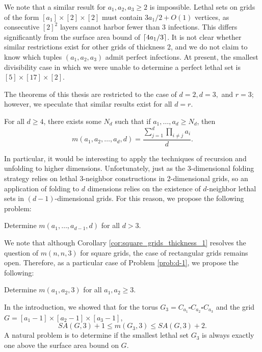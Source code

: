 We note that a similar result for $a_1, a_2,a_3 \geq 2$ is impossible. Lethal sets on grids of the form $[a_1] \times [2] \times [2]$ must contain $3a_1/2+O(1)$ vertices, as consecutive $[2]^2$ layers cannot harbor fewer than 3 infections. This differs significantly from the surface area bound of $\lceil4a_1/3\rceil$. It is not clear whether similar restrictions exist for other grids of thickness 2, and we do not claim to know which tuples $(a_1,a_2,a_3)$ admit perfect infections. At present, the smallest divisibility case in which we were unable to determine a perfect lethal set is $[5] \times [17] \times [2]$. 

The theorems of this thesis are restricted to the case of $d=2, d=3,$ and $r=3$; however, we speculate that similar results exist for all $d=r$. 

\begin{conj}
For all $d \geq 4$, there exists some $N_d$ such that if $a_1, \dots, a_d \geq N_d$, then
$$m(a_1,a_2, \dots, a_d,d) = \frac{\sum_{j=1}^d \prod_{i \neq j} a_i}{d}.$$
\end{conj}

In particular, it would be interesting to apply the techniques of recursion and unfolding to higher dimensions. Unfortunately, just as the 3-dimensional folding strategy relies on lethal 3-neighbor constructions in 2-dimensional grids, so an application of folding to $d$ dimensions relies on the existence of $d$-neighbor lethal sets in $(d-1)$-dimensional grids. For this reason, we propose the following problem:

\begin{prob}
\label{prob:d-1}
Determine $m(a_1, \dots, a_{d-1}, d)$ for all $d > 3$.
\end{prob}

We note that although Corollary \ref{cor:square_grids_thickness_1} resolves the question of $m(n,n,3)$ for square grids, the case of rectangular grids remains open. Therefore, as a particular case of Problem \ref{prob:d-1}, we propose the following:

\begin{prob}
\label{prob:rectangular_2d}
Determine $m(a_1,a_2, 3)$ for all $a_1,a_2 \geq 3$.
\end{prob}


In the introduction, we showed that for the torus $G_{3} = C_{a_1} \square C_{a_2} \square C_{a_3}$ and the grid $G = [a_1-1] \times [a_2-1] \times [a_3-1]$,
$$SA(G, 3) + 1 \leq m(G_3,3) \leq SA(G,3)+2.$$
A natural problem is to determine if the smallest lethal set $G_3$ is always exactly one above the surface area bound on $G$.

